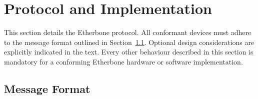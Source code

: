 \documentclass{article}
\begin{document}
\section{Protocol and Implementation}

This section details the Etherbone protocol.
All conformant devices must adhere to the message format outlined in
Section~\ref{sec:fmt}.
Optional design considerations are explicitly indicated in the text.
Every other behaviour described in this section is mandatory for a
conforming Etherbone hardware or software implementation.

\subsection{Message Format}
\label{sec:fmt}

 \settowidth{\bitwidth}{\scriptsize BCAi}
\end{document}
